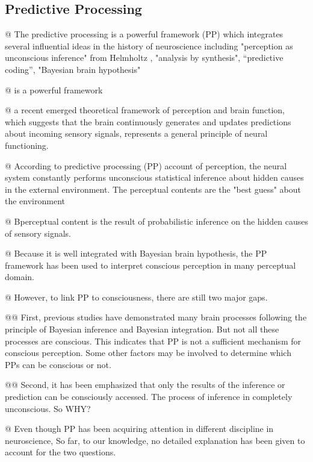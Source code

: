 \documentclass[utf8]{article}
\newenvironment{ants}
			{
			 \begin{easylist}[itemize]		
		 	}
			{
			\end{easylist}
			}
\begin{document}
		\subsection{Predictive Processing}				
			\begin{ants}
				@ The predictive processing is a powerful framework (PP) which integrates several influential ideas in the history of neuroscience including "perception as unconscious inference" from Helmholtz \citet{helmholtz1866concerning}, "analysis by synthesis", “predictive coding”, "Bayesian brain hypothesis" 
				
				
				@ is a powerful framework 
				
				
				@ a recent emerged theoretical framework of perception and brain function, which suggests that the brain continuously generates and updates predictions about incoming sensory signals, represents a general principle of neural functioning.
				
				
				@ According to predictive processing (PP) account of perception, the neural system constantly performs unconscious statistical inference about hidden causes in the external environment. The perceptual contents are the "best guess" about the environment 	\cite{clark_2013}			\cite{Hohwy2013}
				
				@ Bperceptual content is the result of probabilistic inference on the hidden causes of sensory signals. 
				
				
				@ Because it is well integrated with Bayesian brain hypothesis, the PP framework has been used to interpret conscious perception in many perceptual domain. \cite{Hohwy2013} \cite{SethPP2014} 
				
				
				
				@ However, to link PP to consciousness, there are still two major gaps. 
				
				
					@@ First, previous studies have demonstrated many brain processes following the principle of Bayesian inference and Bayesian integration. But not all these processes are conscious. This indicates that PP is not a sufficient mechanism for conscious perception. Some other factors may be involved to determine which PPs can be conscious or not. 
					
					
					@@ Second, it has been emphasized that only the results of the inference or prediction can be consciously accessed. The process of inference in completely unconscious. So WHY?
					
				@ Even though PP has been acquiring attention in different discipline in neuroscience, So far, to our knowledge, no detailed explanation has been given to account for the two questions. 
				

\end{ants}
\end{document}
